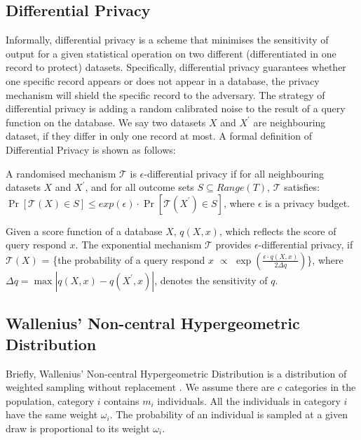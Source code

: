 \documentclass[11pt]{article}
\begin{document}
\subsection{Differential Privacy}
Informally, differential privacy \cite{DWORK2006} is a scheme that minimises the sensitivity of output for a given statistical operation on two different (differentiated in one record to protect) datasets. Specifically, differential privacy guarantees whether one specific record appears or does not appear in a database, the privacy mechanism will shield the specific record to the adversary. The strategy of differential privacy is adding a random calibrated noise to the result of a query function on the database. We say two datasets $X$ and $X^{\prime}$ are neighbouring dataset, if they differ in only one record at most. A formal definition of Differential Privacy is shown as follows:
\begin{definition}
A randomised mechanism $\mathcal{T}$ is $\epsilon$-differential privacy if for all neighbouring datasets $X$ and $X^{\prime}$, and for all outcome sets $S\subseteq Range(T)$, $\mathcal{T}$ satisfies: $\Pr[\mathcal{T}(X)\in S]\leq exp(\epsilon)\cdot\Pr[\mathcal{T}(X^{\prime})\in S]$, where $\epsilon$ is a privacy budget. 
\end{definition}
\begin{definition}
Given a score function of a database $X$, $q(X,x)$, which reflects the score of query respond $x$. The exponential mechanism $\mathcal{T}$ provides $\epsilon$-differential privacy, if $\mathcal{T}(X)$ = \{the probability of a query respond $x$ $\propto$ $\exp({\frac{\epsilon\cdot q(X,x)}{2\Delta q}})$\}, where $\Delta q=\max|q(X,x)-q(X^{\prime},x)|$, denotes the sensitivity of $q$.
\end{definition}

\subsection{Wallenius' Non-central Hypergeometric Distribution}
\label{WNHD}
Briefly, Wallenius' Non-central Hypergeometric Distribution is a distribution of weighted sampling without replacement \cite{WALLENIUS1963}. We assume there are $c$ categories in the population, category $i$ contains $m_i$ individuals. All the individuals in category $i$ have the same weight $\omega_i$. The probability of an individual is sampled at a given draw is proportional to its weight $\omega_i$.
\end{document}
